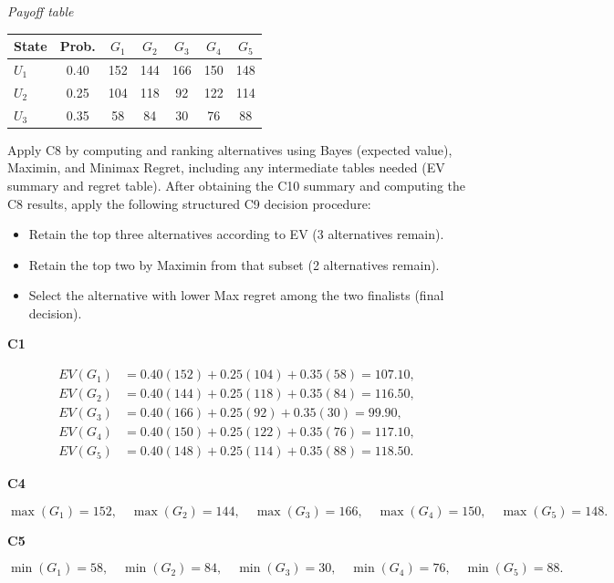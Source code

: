 \begin{ExamProblems}
		\begin{center}
			\textit{Payoff table} \\
			\begin{tabular}{l c c c c c c}
				\hline
				State& Prob. & $G_1$ & $G_2$ & $G_3$ & $G_4$ & $G_5$ \\
				\hline
				$U_1$ & 0.40 & 152 & 144 & 166 & 150 & 148 \\
				$U_2$ & 0.25 & 104 & 118 & 92 & 122 & 114 \\
				$U_3$ & 0.35 & 58 & 84 & 30 & 76 & 88 \\
				\hline
			\end{tabular}
		\end{center}
		
		Apply C8 by computing and ranking alternatives using Bayes (expected value), Maximin, and Minimax Regret, including any intermediate tables needed (EV summary and regret table).
		After obtaining the C10 summary and computing the C8 results, apply the following structured C9 decision procedure:
		\begin{itemize}
			\item Retain the top three alternatives according to EV (3 alternatives remain).
			\item Retain the top two by Maximin from that subset (2 alternatives remain).
			\item Select the alternative with lower Max regret among the two finalists (final decision).
		\end{itemize}
		
		\vspace{0.25cm}
		
		\textbf{C1}\par
				\[
		\begin{aligned}
			EV(G_1)&=0.40(152)+0.25(104)+0.35(58)=107.10,\\
			EV(G_2)&=0.40(144)+0.25(118)+0.35(84)=116.50,\\
			EV(G_3)&=0.40(166)+0.25(92)+0.35(30)=99.90,\\
			EV(G_4)&=0.40(150)+0.25(122)+0.35(76)=117.10,\\
			EV(G_5)&=0.40(148)+0.25(114)+0.35(88)=118.50.
		\end{aligned}
		\]
		

		\textbf{C4}\par
				\[
		\max(G_1)=152,\quad \max(G_2)=144,\quad \max(G_3)=166,\quad \max(G_4)=150,\quad \max(G_5)=148.
		\]
		

		\textbf{C5}\par
				\[
		\min(G_1)=58,\quad \min(G_2)=84,\quad \min(G_3)=30,\quad \min(G_4)=76,\quad \min(G_5)=88.
		\]
		



\end{ExamProblems}
